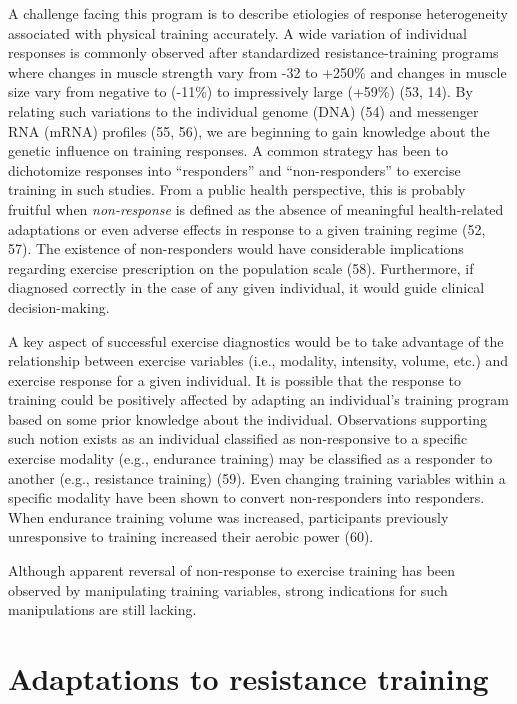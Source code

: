\documentclass[twoside,10pt]{gihclass} %
\begin{document}
A challenge facing this program is to describe etiologies of response heterogeneity associated with physical training accurately. A wide variation of individual responses is commonly observed after standardized resistance-training programs where changes in muscle strength vary from -32 to +250\% and changes in muscle size vary from negative to (-11\%) to impressively large (+59\%)
(53, 14).
By relating such variations to the individual genome (DNA)
(54)
and messenger RNA (mRNA) profiles
(55, 56),
we are beginning to gain knowledge about the genetic influence on training responses.
A common strategy has been to dichotomize responses into ``responders'' and ``non-responders'' to exercise training in such studies.
From a public health perspective, this is probably fruitful when \emph{non-response} is defined as the absence of meaningful health-related adaptations or even adverse effects in response to a given training regime
(52, 57).
The existence of non-responders would have considerable implications regarding exercise prescription on the population scale
(58).
Furthermore, if diagnosed correctly in the case of any given individual, it would guide clinical decision-making.

A key aspect of successful exercise diagnostics would be to take advantage of the relationship between exercise variables (i.e., modality, intensity, volume, etc.) and exercise response for a given individual.
It is possible that the response to training could be positively affected by adapting an individual's training program based on some prior knowledge about the individual.
Observations supporting such notion exists as an individual classified as non-responsive to a specific exercise modality (e.g., endurance training) may be classified as a responder to another (e.g., resistance training)
(59).
Even changing training variables within a specific modality have been shown to convert non-responders into responders. When endurance training volume was increased, participants previously unresponsive to training increased their aerobic power
(60).

Although apparent reversal of non-response to exercise training has been observed by manipulating training variables, strong indications for such manipulations are still lacking.

\hypertarget{adaptations-to-resistance-training}{%
\section{Adaptations to resistance training}\label{adaptations-to-resistance-training}}
\end{document}
